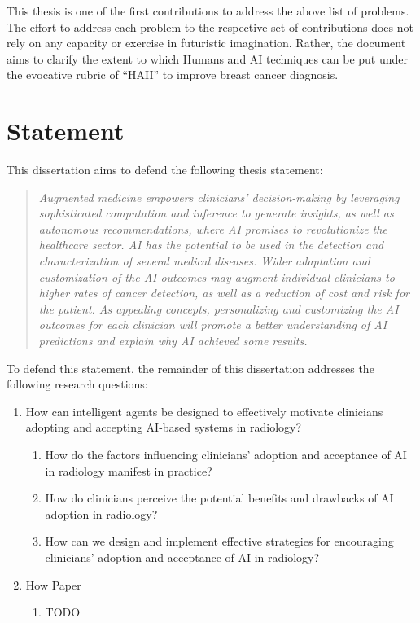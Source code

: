 This thesis is one of the first contributions to address the above list of problems.
The effort to address each problem to the respective set of contributions does not rely on any capacity or exercise in futuristic imagination.
Rather, the document aims to clarify the extent to which Humans and \ac{AI} techniques can be put under the evocative rubric of ``\ac{HAII}'' to improve breast cancer diagnosis.

\section{Statement }
\label{sec:sec001003}

\noindent
This dissertation aims to defend the following thesis statement:

\begin{quote}
{\it
Augmented medicine empowers clinicians' decision-making by leveraging sophisticated computation and inference to generate insights, as well as autonomous recommendations, where \ac{AI} promises to revolutionize the healthcare sector.
\ac{AI} has the potential to be used in the detection and characterization of several medical diseases.
Wider adaptation and customization of the \ac{AI} outcomes may augment individual clinicians to higher rates of cancer detection, as well as a reduction of cost and risk for the patient.
As appealing concepts, personalizing and customizing the \ac{AI} outcomes for each clinician will promote a better understanding of \ac{AI} predictions and explain why \ac{AI} achieved some results.
}
\end{quote}

\noindent
To defend this statement, the remainder of this dissertation addresses the following research questions:

\begin{enumerate}
\item How can intelligent agents be designed to effectively motivate clinicians adopting and accepting AI-based systems in radiology?
\begin{enumerate}
\item How do the factors influencing clinicians' adoption and acceptance of AI in radiology manifest in practice?
\item How do clinicians perceive the potential benefits and drawbacks of AI adoption in radiology?
\item How can we design and implement effective strategies for encouraging clinicians' adoption and acceptance of AI in radiology?
\end{enumerate}
\item How Paper %
\begin{enumerate}
\item TODO %
\end{enumerate}
\end{enumerate}

